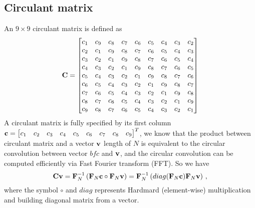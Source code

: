 \documentclass[revised,endfloat]{geophysics}
\begin{document}
\subsection{Circulant matrix}
An $9 \times 9$ circulant matrix is defined as
\begin{equation}
{\bf C} = 
\begin{bmatrix}
c_1 & c_9 & c_8 & c_7 & c_6 & c_5 &  c_4 & c_3 & c_2 \\ 
c_2 & c_1 & c_9 & c_8 & c_7 & c_6 &  c_5 & c_4 & c_3 \\ 
c_3 & c_2 & c_1 & c_9 & c_8 & c_7 &  c_6 & c_5 & c_4 \\ 
c_4 & c_3 & c_2 & c_1 & c_9 & c_8 &  c_7 & c_6 & c_5 \\ 
c_5 & c_4 & c_3 & c_2 & c_1 & c_9 &  c_8 & c_7 & c_6 \\ 
c_6 & c_5 & c_4 & c_3 & c_2 & c_1 &  c_9 & c_8 & c_7 \\ 
c_7 & c_6 & c_5 & c_4 & c_3 & c_2 &  c_1 & c_9 & c_8 \\ 
c_8 & c_7 & c_6 & c_5 & c_4 & c_3 &  c_2 & c_1 & c_9 \\ 
c_9 & c_8 & c_7 & c_6 & c_5 & c_4 &  c_3 & c_2 & c_1 \\ 
\end{bmatrix}
\end{equation} 
A circulant matrix is fully specified by its first column ${\bf c} = \begin{bmatrix}
c_1 & c_2 &  c_3 &  c_4 &  c_5 &  c_6 &  c_7 &  c_8 &  c_9  \end{bmatrix}^T$, we know that the product between circulant matrix and a vector ${\bf v}$ length of $N$ is equivalent to the circular convolution between vector ${bf c}$ and ${\bf v}$, and the circular convolution can be computed efficiently via Fast Fourier transform (FFT). So we have
\begin{equation}
{\bf Cv} = {\bf F}_N^{-1} \left(  {\bf F}_N {\bf c} \circ {\bf F}_N {\bf v} \right)  =  {\bf F}_N^{-1} \left(  diag({\bf F}_N {\bf c}) {\bf F}_N {\bf v} \right) \,,
\end{equation}
where the symbol $\circ$ and $diag$ represents Hardmard (element-wise) multiplication and building diagonal matrix from a vector.
\end{document}
